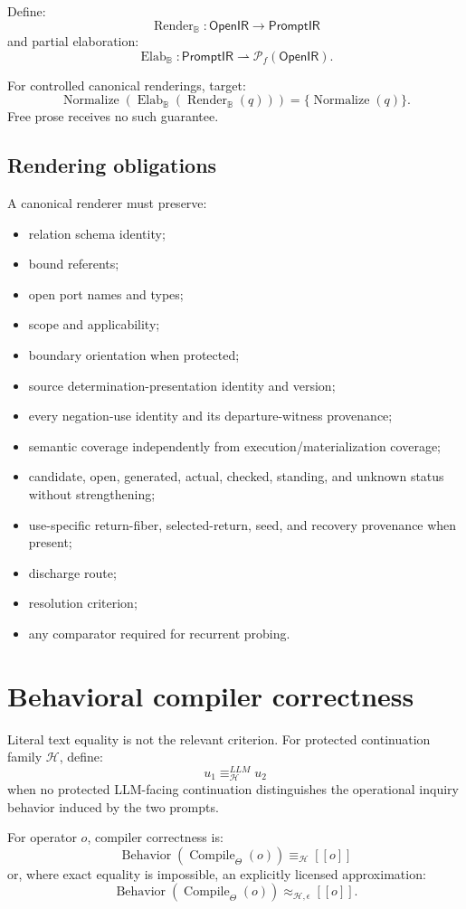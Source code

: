 \documentclass[11pt,oneside]{article}
\newcommand{\B}{\mathbb B}
\newcommand{\OpenIR}{\mathsf{OpenIR}}
\newcommand{\PromptIR}{\mathsf{PromptIR}}
\newcommand{\Compile}{\operatorname{Compile}}
\newcommand{\Render}{\operatorname{Render}}
\newcommand{\Elab}{\operatorname{Elab}}
\newcommand{\Normalize}{\operatorname{Normalize}}
\newcommand{\den}[1]{[\![#1]\!]}
\begin{document}
Define:
\[
\Render_{\B}:
\OpenIR\to\PromptIR
\]
and partial elaboration:
\[
\Elab_{\B}:
\PromptIR\rightharpoonup\mathcal P_f(\OpenIR).
\]

For controlled canonical renderings, target:
\[
\boxed{
\Normalize(
\Elab_{\B}(\Render_{\B}(q))
)
=
\{\Normalize(q)\}.
}
\]
Free prose receives no such guarantee.

\subsection{Rendering obligations}

A canonical renderer must preserve:
\begin{itemize}
\item relation schema identity;
\item bound referents;
\item open port names and types;
\item scope and applicability;
\item boundary orientation when protected;
\item source determination-presentation identity and version;
\item every negation-use identity and its departure-witness provenance;
\item semantic coverage independently from execution/materialization coverage;
\item candidate, open, generated, actual, checked, standing, and unknown status without strengthening;
\item use-specific return-fiber, selected-return, seed, and recovery provenance when present;
\item discharge route;
\item resolution criterion;
\item any comparator required for recurrent probing.
\end{itemize}

\section{Behavioral compiler correctness}

Literal text equality is not the relevant criterion.  For protected continuation family \(\mathcal H\), define:
\[
u_1\equiv_{\mathcal H}^{LLM}u_2
\]
when no protected LLM-facing continuation distinguishes the operational inquiry behavior induced by the two prompts.

For operator \(o\), compiler correctness is:
\[
\boxed{
\operatorname{Behavior}(\Compile_\Theta(o))
\equiv_{\mathcal H}
\den{o}
}
\]
or, where exact equality is impossible, an explicitly licensed approximation:
\[
\operatorname{Behavior}(\Compile_\Theta(o))
\approx_{\mathcal H,\epsilon}
\den{o}.
\]
\end{document}
